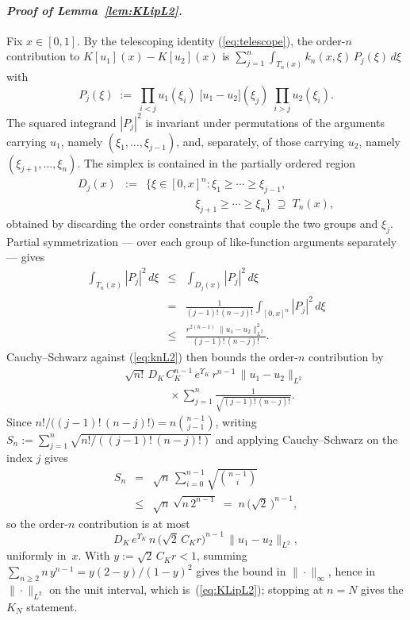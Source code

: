 \documentclass[10pt,a4paper]{amsart}
\newcommand{\Ltwo}{L^2}
\begin{document}
\paragraph*{\normalfont\em Proof of Lemma~\ref{lem:KLipL2}.}
Fix $x \in [0,1]$. By the telescoping identity (\ref{eq:telescope}), the order-$n$ contribution to $K[u_1](x) - K[u_2](x)$ is $\sum_{j=1}^n \int_{T_n(x)} k_n(x,\xi)\, P_j(\xi)\, d\xi$ with
\begin{equation}
P_j(\xi) \;:=\; \prod_{i<j} u_1(\xi_i)\;\bigl[u_1 - u_2\bigr](\xi_j)\;\prod_{i>j} u_2(\xi_i).
\label{eq:Pjdef}
\end{equation}
The squared integrand $|P_j|^2$ is invariant under permutations of the arguments carrying $u_1$, namely $(\xi_1,\ldots,\xi_{j-1})$, and, separately, of those carrying $u_2$, namely $(\xi_{j+1},\ldots,\xi_n)$. The simplex is contained in the partially ordered region
\begin{eqnarray}
D_j(x) &:=& \bigl\{\xi \in [0,x]^n : \xi_1 \ge \cdots \ge \xi_{j-1}, \nonumber \\
&& \qquad\qquad\ \ \xi_{j+1} \ge \cdots \ge \xi_n\bigr\} \;\supseteq\; T_n(x),
\label{eq:Djdef}
\end{eqnarray}
obtained by discarding the order constraints that couple the two groups and $\xi_j$. Partial symmetrization --- over each group of like-function arguments separately --- gives
\begin{eqnarray}
\int_{T_n(x)} |P_j|^2\, d\xi &\le& \int_{D_j(x)} |P_j|^2\, d\xi \nonumber \\
&=& \frac{1}{(j-1)!\,(n-j)!} \int_{[0,x]^n} |P_j|^2\, d\xi \nonumber \\
&\le& \frac{r^{2(n-1)}\;\|u_1 - u_2\|_{\Ltwo}^2}{(j-1)!\,(n-j)!}.
\label{eq:block_bound}
\end{eqnarray}
Cauchy--Schwarz against (\ref{eq:knL2}) then bounds the order-$n$ contribution by
\begin{eqnarray}
&& \sqrt{n!}\, D_K\, C_K^{n-1}\, e^{\Upsilon_K}\, r^{n-1}\, \|u_1 - u_2\|_{\Ltwo} \nonumber \\
&& \qquad\qquad \times \sum_{j=1}^n \frac{1}{\sqrt{(j-1)!\,(n-j)!}}.
\label{eq:ordern_raw}
\end{eqnarray}
Since $n!/\bigl((j-1)!\,(n-j)!\bigr) = n \binom{n-1}{j-1}$, writing $S_n := \sum_{j=1}^n \sqrt{n!/((j-1)!\,(n-j)!)}$ and applying Cauchy--Schwarz on the index $j$ gives
\begin{eqnarray}
S_n &=& \sqrt{n}\, \sum_{i=0}^{n-1} \sqrt{\binom{n-1}{i}} \nonumber \\
&\le& \sqrt{n}\,\sqrt{n\, 2^{n-1}} \;=\; n\,\bigl(\sqrt{2}\,\bigr)^{n-1},
\label{eq:comb_bound}
\end{eqnarray}
so the order-$n$ contribution is at most
\begin{equation}
D_K\, e^{\Upsilon_K}\, n\, \bigl(\sqrt{2}\,C_K r\bigr)^{n-1}\, \|u_1 - u_2\|_{\Ltwo},
\label{eq:ordern_final}
\end{equation}
uniformly in~$x$. With $y := \sqrt{2}\,C_K r < 1$, summing $\sum_{n \ge 2} n\, y^{n-1} = y(2-y)/(1-y)^2$ gives the bound in $\|\cdot\|_\infty$, hence in $\|\cdot\|_{\Ltwo}$ on the unit interval, which is~(\ref{eq:KLipL2}); stopping at $n = N$ gives the $K_N$ statement.
\end{document}
